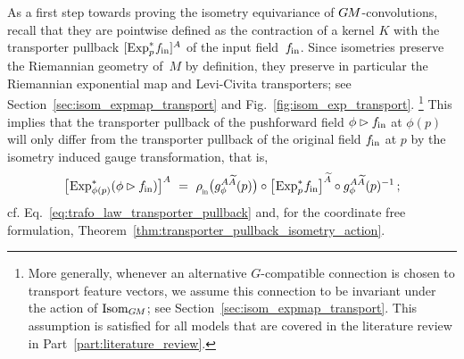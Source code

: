 As a first step towards proving the isometry equivariance of $G\mkern-1.4muM$-convolutions, recall that they are pointwise defined as the contraction of a kernel $K$ with the transporter pullback $[\operatorname{Exp}^*_p\mkern-2mu f_\textup{\;\!\!in}]^A$ of the input field~$f_\textup{\;\!\!in}$.
Since isometries preserve the Riemannian geometry of~$M$ by definition, they preserve in particular the Riemannian exponential map and Levi-Civita transporters; see Section~\ref{sec:isom_expmap_transport} and Fig.~\ref{fig:isom_exp_transport}.%
\footnote{
    More generally, whenever an alternative $G$-compatible connection is chosen to transport feature vectors, we assume this connection to be invariant under the action of $\operatorname{Isom}_{G\mkern-1.4muM}$; see Section~\ref{sec:isom_expmap_transport}.
    This assumption is satisfied for all models that are covered in the literature review in Part~\ref{part:literature_review}.
}
This implies that the transporter pullback of the pushforward field $\phi\rhd f_\textup{\;\!\!in}$ at $\phi(p)$ will only differ from the transporter pullback of the original field $f_\textup{\;\!\!in}$ at $p$ by the isometry induced gauge transformation, that is,
\begin{align}\label{eq:transporter_pullback_pushforward_field}
    \big[\mkern-2mu \Expsphip (\phi\rhd\fin) \big]^A\ =\ 
    \rhoin\big( g_\phi^{A\widetilde{A}}(p)\big) \circ \big[\mkern-2mu \Expspfin\big]^{\widetilde{A}} \circ g_\phi^{A\widetilde{A}}(p)^{-1} \,;
\end{align}
cf. Eq.~\eqref{eq:trafo_law_transporter_pullback} and, for the coordinate free formulation, Theorem~\ref{thm:transporter_pullback_isometry_action}.

